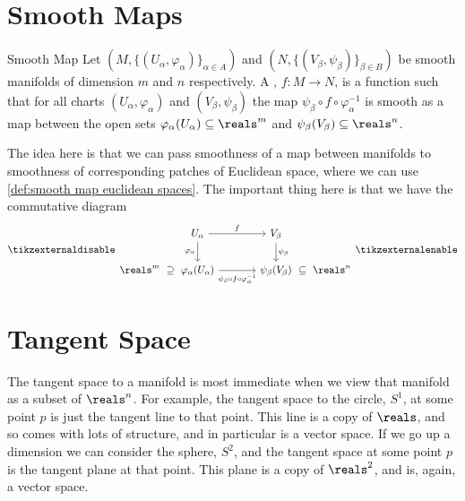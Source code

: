 \documentclass[fleqn]{NotesClass}
\begin{document}
    \section{Smooth Maps}
    \begin{dfn}{Smooth Map}{}
        Let \((M, \{(U_\alpha, \varphi_\alpha)\}_{\alpha \in A})\) and \((N, \{(V_\beta, \psi_\beta)\}_{\beta \in B})\) be smooth manifolds of dimension \(m\) and \(n\) respectively.
        A , \(f \colon M \to N\), is a function such that for all charts \((U_\alpha, \varphi_\alpha)\) and \((V_\beta, \psi_\beta)\) the map \(\psi_\beta \circ f \circ \varphi_\alpha^{-1}\) is smooth as a map between the open sets \(\varphi_\alpha(U_\alpha) \subseteq \reals^m\) and \(\psi_\beta(V_\beta) \subseteq \reals^n\).
    \end{dfn}
    
    The idea here is that we can pass smoothness of a map between manifolds to smoothness of corresponding patches of Euclidean space, where we can use \cref{def:smooth map euclidean spaces}.
    The important thing here is that we have the commutative diagram
    \begin{equation}
        \tikzexternaldisable
        \begin{tikzcd}[column sep=small]
            & U_\alpha \arrow[rrr, "f"] \arrow[d, "\varphi_\alpha"'] &&& V_\beta \arrow[d, "\psi_\beta"]\\
            \reals^m \arrow[r, phantom, "\supseteq"] & \varphi_\alpha(U_\alpha) \arrow[rrr, "\psi_\beta \circ f \circ \varphi_\alpha^{-1}"'{yshift=-0.05cm}] &&& \psi_\beta(V_\beta) \arrow[r, phantom, "\subseteq"] & \reals^n
        \end{tikzcd}
        \tikzexternalenable
    \end{equation}
    
    \section{Tangent Space}
    The tangent space to a manifold is most immediate when we view that manifold as a subset of \(\reals^n\).
    For example, the tangent space to the circle, \(S^1\), at some point \(p\) is just the tangent line to that point.
    This line is a copy of \(\reals\), and so comes with lots of structure, and in particular is a vector space.
    If we go up a dimension we can consider the sphere, \(S^2\), and the tangent space at some point \(p\) is the tangent plane at that point.
    This plane is a copy of \(\reals^2\), and is, again, a vector space.
    
\end{document}
